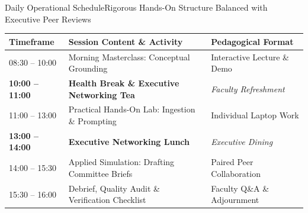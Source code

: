 \documentclass[aspectratio=169, 10pt]{beamer}
\begin{document}
\begin{frame}{Daily Operational Schedule}{Rigorous Hands-On Structure Balanced with Executive Peer Reviews}
  \begin{center}
    \small
    \begin{tabularx}{0.94\textwidth}{@{}>{}p{2.8cm}X>{}p{3.5cm}@{}}
      \toprule
      \textbf{\textcolor{tanzaniablue}{Timeframe}} & \textbf{\textcolor{tanzaniablue}{Session Content \& Activity}} & \textbf{\textcolor{tanzaniablue}{Pedagogical Format}} \\
      \midrule
      08:30 -- 10:00 & Morning Masterclass: Conceptual Grounding & Interactive Lecture \& Demo \\
      \textbf{\textcolor{suagreen}{10:00 -- 11:00}} & \textbf{\textcolor{suagreen}{Health Break \& Executive Networking Tea}} & \textit{Faculty Refreshment} \\
      11:00 -- 13:00 & Practical Hands-On Lab: Ingestion \& Prompting & Individual Laptop Work \\
      \textbf{\textcolor{suagreen}{13:00 -- 14:00}} & \textbf{\textcolor{suagreen}{Executive Networking Lunch}} & \textit{Executive Dining} \\
      14:00 -- 15:30 & Applied Simulation: Drafting Committee Briefs & Paired Peer Collaboration \\
      15:30 -- 16:00 & Debrief, Quality Audit \& Verification Checklist & Faculty Q\&A \& Adjournment \\
      \bottomrule
    \end{tabularx}
  \end{center}
\end{frame}
\end{document}
